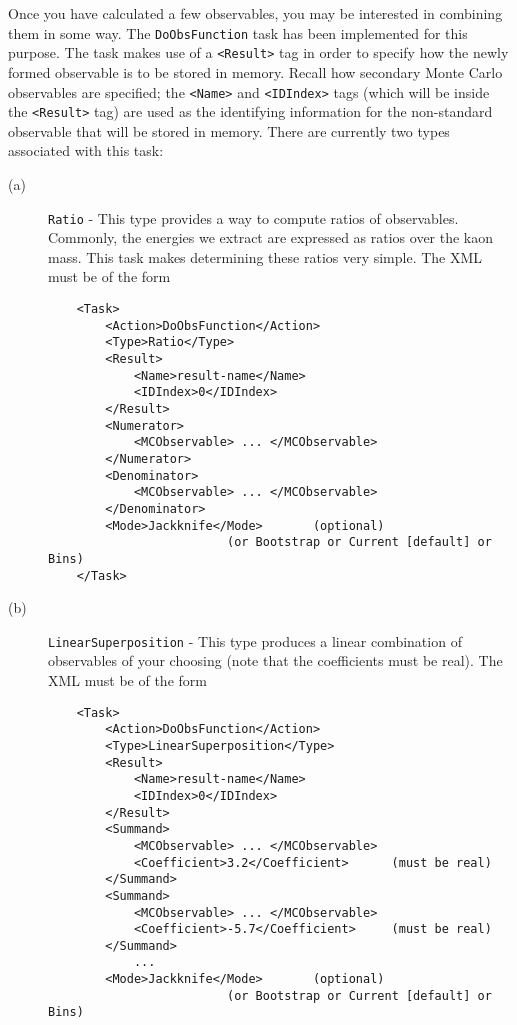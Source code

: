 \documentclass[12pt]{article}
\newcommand{\vb}{\texttt}
\begin{document}
Once you have calculated a few observables, you may be interested in combining them in some way.
The \vb{DoObsFunction} task has been implemented for this purpose.
The task makes use of a \vb{<Result>} tag in order to specify how
the newly formed observable is to be stored in memory.
Recall how secondary Monte Carlo observables are specified; the \vb{<Name>}
and \vb{<IDIndex>} tags (which will be inside the \vb{<Result>} tag)
are used as the identifying information
for the non-standard observable that will be stored in memory.
There are currently two types
associated with this task:
\begin{description}
\item[(a)] \vb{Ratio} - This type provides a way to compute ratios of observables. Commonly,
the energies we extract are expressed as ratios over the kaon mass. This task makes
determining these ratios very simple. The XML must be of the form
\begin{verbatim}
    <Task>
        <Action>DoObsFunction</Action>
        <Type>Ratio</Type>
        <Result>
            <Name>result-name</Name>
            <IDIndex>0</IDIndex>
        </Result>
        <Numerator>
            <MCObservable> ... </MCObservable>
        </Numerator>
        <Denominator>
            <MCObservable> ... </MCObservable>
        </Denominator>
        <Mode>Jackknife</Mode>       (optional)
                         (or Bootstrap or Current [default] or Bins)
    </Task>
\end{verbatim}
\item[(b)] \vb{LinearSuperposition} - This type produces a linear combination
of observables of your choosing (note that the coefficients must be real).
The XML must be of the form
\begin{verbatim}
    <Task>
        <Action>DoObsFunction</Action>
        <Type>LinearSuperposition</Type>
        <Result>
            <Name>result-name</Name>
            <IDIndex>0</IDIndex>
        </Result>
        <Summand>
            <MCObservable> ... </MCObservable>
            <Coefficient>3.2</Coefficient>      (must be real)
        </Summand>
        <Summand>
            <MCObservable> ... </MCObservable>
            <Coefficient>-5.7</Coefficient>     (must be real)
        </Summand>
            ...
        <Mode>Jackknife</Mode>       (optional)
                         (or Bootstrap or Current [default] or Bins)
\end{verbatim}
\end{description}
\end{document}
